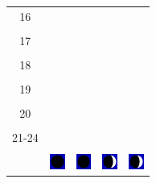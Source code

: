 \documentclass[twoside, a4paper,12pt, tikz]{scrartcl}
\begin{document}
\begin{tabularx}{\linewidth}{|c|X|X|p{2cm}|p{2cm}|}
            &   &       &    &   \\
          \hline
          16&   &                 &    &   \\
            &   &       &    &   \\
          \hline
          17&   &                 &    &   \\
            &   &       &    &   \\
          \hline
          18&   &                 &    &   \\
            &   &       &    &   \\
          \hline
          19&   &                 &     &   \\
            &   &       &    &   \\
          \hline
          20&   &              &    &   \\
            &   &       &    &   \\
          \hline 
          21-24&   &              &    &   \\
            &   &       &    &   \\
          \hline
                      & \vspace{0.01cm} \centerline{\includegraphics[width=0.5cm]{moon_phases/Moon_phase_0.svg.png}} \vspace{0.1cm} & \vspace{0.01cm} \centerline{\includegraphics[width=0.5cm]{moon_phases/Moon_phase_0.svg.png}} \vspace{0.1cm} & \vspace{0.01cm} \centerline{\includegraphics[width=0.5cm]{moon_phases/Moon_phase_1.svg.png}} \vspace{0.1cm} & \vspace{0.01cm} \centerline{\includegraphics[width=0.5cm]{moon_phases/Moon_phase_1.svg.png}} \vspace{0.1cm}\\
          \hline    
        \end{tabularx}
\end{document}
